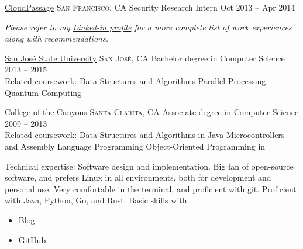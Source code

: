\documentclass[10pt]{article}
\begin{document}
\headedsection  %
  {\href{http://www.cloudpassage.com}{CloudPassage}}
  {\textsc{San Francisco, CA}} {%
  \headedsubsection
    {Security Research Intern}
    {Oct 2013 -- Apr 2014}
    {}
}

\vspace{-0.2em}
\begin{center}
  \emph{\small Please refer to my \href{http://www.linkedin.com/in/skylerhawthorne}{Linked-in profile} for a more complete list of work experiences along with recommendations.}
\end{center}


\spacedhrule{-0.2em}{-0.4em}


\headedsection
  {\href{http://www.sjsu.edu/}{San Jos\'{e} State University}}
  {\textsc{San Jos\'{e}, CA}} {%
  \headedsubsection
    {Bachelor degree in Computer Science}
    {2013 -- 2015}
    {
		\\
		Related coursework: Data Structures and Algorithms \sbull
		Parallel Processing \sbull
		Quantum Computing
	}
}

\headedsection
  {\href{http://www.canyons.edu/}{College of the Canyons}}
  {\textsc{Santa Clarita, CA}} {%
  \headedsubsection
    {Associate degree in Computer Science}
    {2009 -- 2013} {
		\\
		Related coursework: Data Structures and Algorithms in Java \sbull
		Microcontrollers and Assembly Language Programming \sbull
		Object-Oriented Programming in \CPP
	}
}

\spacedhrule{0.5em}{-0.4em}


\inlineheadsection  %
  {Technical expertise:}
  {Software design and implementation. Big fan of open-source software, and prefers Linux in all environments, both for development and personal use. Very comfortable in the terminal, and proficient with git. Proficient with Java, Python, Go, and Rust. Basic skills with \CPP.}

\begin{itemize}
	\item{\href{http://dead10ck.github.io/}{Blog}}
	\item{\href{https://github.com/dead10ck}{GitHub}}
\end{itemize}
\end{document}
